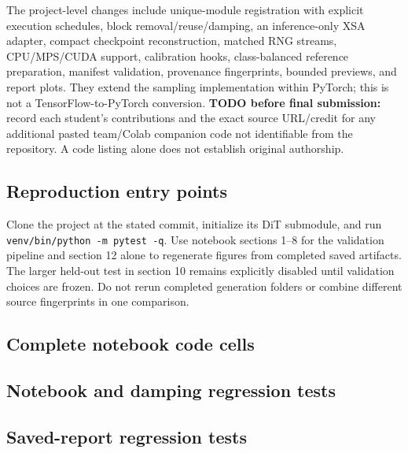 The project-level changes include unique-module registration with explicit
execution schedules, block removal/reuse/damping, an inference-only XSA
adapter, compact checkpoint reconstruction, matched RNG streams,
CPU/MPS/CUDA support, calibration hooks, class-balanced reference preparation,
manifest validation, provenance fingerprints, bounded previews, and report
plots. They extend the sampling implementation within PyTorch; this is not
a TensorFlow-to-PyTorch conversion. \textbf{TODO before final submission:}
record each student's contributions and the exact source URL/credit for any
additional pasted team/Colab companion code not identifiable from the
repository. A code listing alone does not establish original authorship.

\subsection{Reproduction entry points}
Clone the project at the stated commit, initialize its DiT submodule, and run
\texttt{venv/bin/python -m pytest -q}. Use notebook sections 1--8 for the
validation pipeline and section 12 alone to regenerate figures from completed
saved artifacts. The larger held-out test in section 10 remains explicitly
disabled until validation choices are frozen. Do not rerun completed
generation folders or combine different source fingerprints in one comparison.

\onecolumn
{}
\subsection{Complete notebook code cells}

\subsection{Notebook and damping regression tests}

\subsection{Saved-report regression tests}

